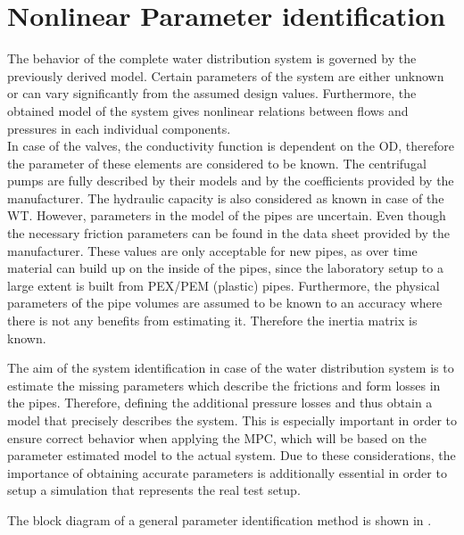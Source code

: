 \section{Nonlinear Parameter identification}
\label{SubSecEstimation}

The behavior of the complete water distribution system is governed by the previously derived model. Certain parameters of the system are either unknown or can vary significantly from the assumed design values. Furthermore, the obtained model of the system gives nonlinear relations between flows and pressures in each individual components. 
\\  
In case of the valves, the conductivity function is dependent on the OD, therefore the parameter of these elements are considered to be known. The centrifugal pumps are fully described by their models and by the coefficients provided by the manufacturer. The hydraulic capacity is also considered as known in case of the WT. However, parameters in the model of the pipes are uncertain. Even though the necessary friction parameters can be found in the data sheet provided by the manufacturer. These values are only acceptable for new pipes, as over time material can build up on the inside of the pipes, since the laboratory setup to a large extent is built from PEX/PEM (plastic) pipes. Furthermore, the physical parameters of the pipe volumes are assumed to be known to an accuracy where there is not any benefits from estimating it. Therefore the inertia matrix is known.  

The aim of the system identification in case of the water distribution system is to estimate the missing parameters which describe the frictions and form losses in the pipes. Therefore, defining the additional pressure losses and thus obtain a model that precisely describes the system. This is especially important in order to ensure correct behavior when applying the MPC, which will be based on the parameter estimated model to the actual system. Due to these considerations, the importance of obtaining accurate parameters is additionally essential in order to setup a simulation that represents the real test setup. 


The block diagram of a general parameter identification method is shown in . 

